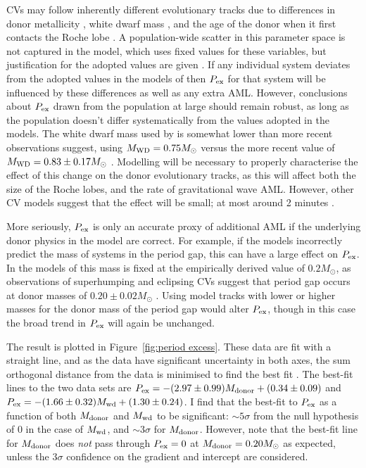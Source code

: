 CVs may follow inherently different evolutionary tracks due to differences in donor metallicity \citep{stehle1997, harrison2016}, white dwarf mass \citep{knigge2006}, and the age of the donor when it first contacts the Roche lobe \citep{howell2001}. A population-wide scatter in this parameter space is not captured in the \citet{knigge11} model, which uses fixed values for these variables, but justification for the adopted values are given \citep{knigge11, knigge2006}.
If any individual system deviates from the adopted values in the models of \citet{knigge11} then $P_{\rm ex}$ for that system will be influenced by these differences as well as any extra AML. However, conclusions about $P_{\rm ex}$ drawn from the population at large should remain robust, as long as the population doesn't differ systematically from the values adopted in the models. The white dwarf mass used by \citet{knigge11} is somewhat lower than more recent observations suggest, using $M_{\rm WD} = 0.75 M_\odot$ versus the more recent value of $M_{\rm WD} = 0.83 \pm 0.17 M_\odot$ \citep{pala2020}. Modelling will be necessary to properly characterise the effect of this change on the donor evolutionary tracks, as this will affect both the size of the Roche lobes, and the rate of gravitational wave AML. However, other CV models suggest that the effect will be small; at most around 2 minutes \citep{goliasch2015}.

More seriously, $P_{\rm ex}$ is only an accurate proxy of additional AML if the underlying donor physics in the model are correct. For example, if the models incorrectly predict the mass of systems in the period gap, this can have a large effect on $P_{\rm ex}$. In the models of \citet{knigge11} this mass is fixed at the empirically derived value of $0.2 M_\odot$, as observations of superhumping and eclipsing CVs suggest that period gap occurs at donor masses of $0.20 \pm 0.02 M_\odot$ \citep{knigge2006}. Using model tracks with lower or higher masses for the donor mass of the period gap would alter $P_{\rm ex}$, though in this case the broad trend in $P_{\rm ex}$ will again be unchanged.

The result is plotted in Figure~\ref{fig:period excess}. These data are fit with a straight line, and as the data have significant uncertainty in both axes, the sum orthogonal distance from the data is minimised to find the best fit \citep{hogg2010}. The best-fit lines to the two data sets are $P_{\rm ex} = -(2.97\pm0.99) M_{\rm donor} + (0.34\pm0.09)$ and $P_{\rm ex} = -(1.66\pm0.32) M_{\rm wd} + (1.30\pm0.24)$.
I find that the best-fit to $P_{\rm ex}$ as a function of both $M_{\rm donor}$ and $M_{\rm wd}$ to be significant: $\sim 5\sigma$ from the null hypothesis of 0 in the case of $M_{\rm wd}$, and $\sim 3\sigma$ for $M_{\rm donor}$.
 However, note that the best-fit line for $M_{\rm donor}$ does \textit{not} pass through $P_{\rm ex} = 0$ at $M_{\rm donor} = 0.20 M_\odot$ as expected, unless the $3\sigma$ confidence on the gradient and intercept are considered.

